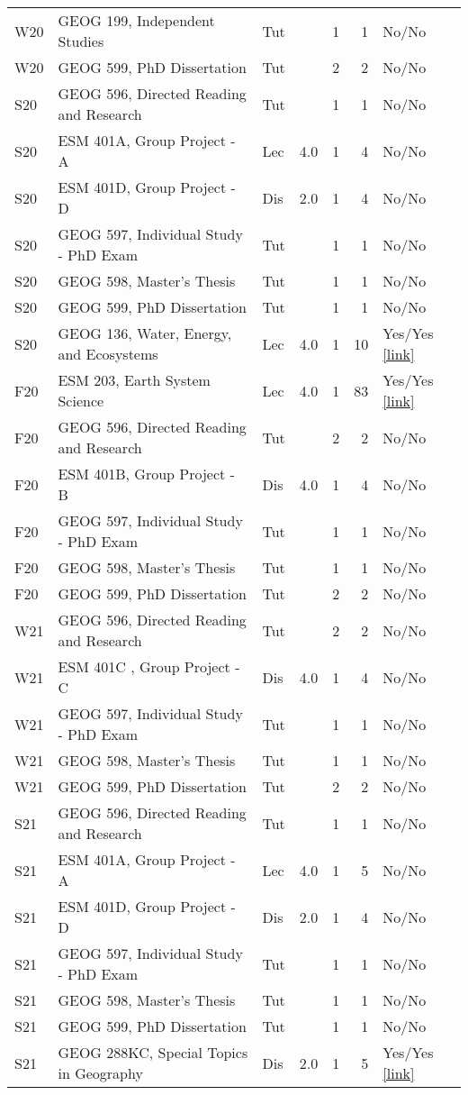 \begin{longtable}{p{1cm}p{7cm}p{0.75cm}rrrp{2.5cm}}
W20 & GEOG 199, Independent Studies & Tut &  & 1 & 1 & No/No    \\ 
W20 & GEOG 599, PhD Dissertation & Tut &  & 2 & 2 & No/No    \\ 
S20 & GEOG 596, Directed Reading and Research & Tut &  & 1 & 1 & No/No    \\ 
S20 & ESM 401A, Group Project - A & Lec & 4.0 & 1 & 4 & No/No    \\ 
S20 & ESM 401D, Group Project - D & Dis & 2.0 & 1 & 4 & No/No    \\ 
S20 & GEOG 597, Individual Study - PhD Exam & Tut &  & 1 & 1 & No/No    \\ 
S20 & GEOG 598, Master’s Thesis & Tut &  & 1 & 1 & No/No    \\ 
S20 & GEOG 599, PhD Dissertation & Tut &  & 1 & 1 & No/No    \\ 
S20 & GEOG 136, Water, Energy, and Ecosystems & Lec & 4.0 & 1 & 10 & Yes/Yes  \href{https://ucsb.box.com/s/4k3squfamwz4gg5mj2q79wo5qk29bubb}{[link]}  \\ 
F20 & ESM 203, Earth System Science & Lec & 4.0 & 1 & 83 & Yes/Yes  \href{https://ucsb.box.com/s/x8g8gcl7mtfahclm1zledaita1z5tgin}{[link]}  \\ 
F20 & GEOG 596, Directed Reading and Research & Tut &  & 2 & 2 & No/No    \\ 
F20 & ESM 401B, Group Project - B & Dis & 4.0 & 1 & 4 & No/No    \\ 
F20 & GEOG 597, Individual Study - PhD Exam & Tut &  & 1 & 1 & No/No    \\ 
F20 & GEOG 598, Master’s Thesis & Tut &  & 1 & 1 & No/No    \\ 
F20 & GEOG 599, PhD Dissertation & Tut &  & 2 & 2 & No/No    \\ 
W21 & GEOG 596, Directed Reading and Research & Tut &  & 2 & 2 & No/No    \\ 
W21 & ESM 401C , Group Project - C & Dis & 4.0 & 1 & 4 & No/No    \\ 
W21 & GEOG 597, Individual Study - PhD Exam & Tut &  & 1 & 1 & No/No    \\ 
W21 & GEOG 598, Master’s Thesis & Tut &  & 1 & 1 & No/No    \\ 
W21 & GEOG 599, PhD Dissertation & Tut &  & 2 & 2 & No/No    \\ 
S21 & GEOG 596, Directed Reading and Research & Tut &  & 1 & 1 & No/No    \\ 
S21 & ESM 401A, Group Project - A & Lec & 4.0 & 1 & 5 & No/No    \\ 
S21 & ESM 401D, Group Project - D & Dis & 2.0 & 1 & 4 & No/No    \\ 
S21 & GEOG 597, Individual Study - PhD Exam & Tut &  & 1 & 1 & No/No    \\ 
S21 & GEOG 598, Master’s Thesis & Tut &  & 1 & 1 & No/No    \\ 
S21 & GEOG 599, PhD Dissertation & Tut &  & 1 & 1 & No/No    \\ 
S21 & GEOG 288KC, Special Topics in Geography & Dis & 2.0 & 1 & 5 & Yes/Yes  \href{https://ucsb.box.com/s/wkdexakrybpri16xk2gu5860so2ae0xa}{[link]}  \\ 
 
\end{longtable}

